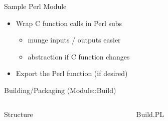 \documentclass{beamer}
\begin{document}
\begin{frame}[fragile]{Sample Perl Module}
  \begin{block}{}
    \scriptsize
    
  \end{block}
  \begin{itemize}
    \item Wrap C function calls in Perl subs
    \begin{itemize}
      \item munge inputs / outputs easier
      \item abstraction if C function changes
    \end{itemize}
    \item Export the Perl function (if desired)
  \end{itemize}
\end{frame}

\begin{frame}{Building/Packaging (Module::Build)}
  \begin{columns}
    \begin{column}{0.49\linewidth}
      \begin{block}{Structure}
      \end{block}
      \vspace{4mm}
    \end{column}
    \begin{column}{0.49\linewidth}
      \scriptsize
      \begin{block}{Build.PL}
        
      \end{block}
    \end{column}
  \end{columns}
\end{frame}
\end{document}
